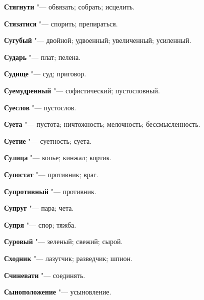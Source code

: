 \begin{mymulticols}{2}
\noindent\textbf{Стягнути} "--- обвязать; собрать; исцелить. 




\noindent\textbf{Стязатися} "--- спорить; препираться. 




\noindent\textbf{Сугубый} "--- двойной; удвоенный; увеличенный; усиленный. 




\noindent\textbf{Сударь} "--- плат; пелена. 




\noindent\textbf{Судище} "--- суд; приговор. 




\noindent\textbf{Суемудренный} "--- софистический; пустословный. 




\noindent\textbf{Суеслов} "--- пустослов. 




\noindent\textbf{Суета} "--- пустота; ничтожность; мелочность; бессмысленность. 




\noindent\textbf{Суетие} "--- суетность; суета. 




\noindent\textbf{Сулица} "--- копье; кинжал; кортик. 




\noindent\textbf{Супостат} "--- противник; враг. 




\noindent\textbf{Супротивный} "--- противник. 




\noindent\textbf{Супруг} "--- пара; чета. 




\noindent\textbf{Супря} "--- спор; тяжба. 




\noindent\textbf{Суровый} "--- зеленый; свежий; сырой. 




\noindent\textbf{Сходник} "--- лазутчик; разведчик; шпион. 




\noindent\textbf{Счиневати} "--- соединять. 




\noindent\textbf{Сыноположение} "--- усыновление. 




\bukvaending







\end{mymulticols}
